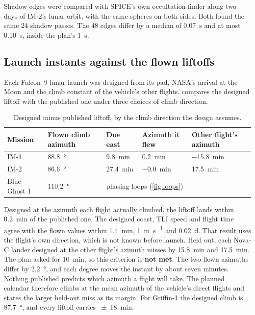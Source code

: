\documentclass[11pt,a4paper]{article}
\begin{document}
Shadow edges were compared with SPICE's own occultation finder along two days of IM-2's
lunar orbit, with the same spheres on both sides. Both found the same 24 shadow passes.
The 48 edges differ by a median of \qty{0.07}{\s} and at most \qty{0.10}{\s}, inside the
plan's \qty{1}{\s}.

\subsection{Launch instants against the flown liftoffs}

Each Falcon~9 lunar launch was designed from its pad, NASA's arrival at the Moon and the
climb constant of the vehicle's other flights.  compares the designed
liftoff with the published one under three choices of climb direction.

\begin{table}[htbp]
\centering\small
\caption{Designed minus published liftoff, by the climb direction the design assumes.}
\label{tab:launch}
\begin{tabular}{@{}lllll@{}}
\toprule
Mission & Flown climb azimuth & Due east & Azimuth it flew & Other flight's azimuth \\
\midrule
IM-1 & \qty{88.8}{\degree} & \qty{+9.8}{\minute} & \qty{+0.2}{\minute} & \qty{-15.8}{\minute} \\
IM-2 & \qty{86.6}{\degree} & \qty{+27.4}{\minute} & \qty{-0.0}{\minute} & \qty{+17.5}{\minute} \\
Blue Ghost 1 & \qty{110.2}{\degree} & \multicolumn{3}{l}{phasing loops (\cref{fig:loops})} \\
\bottomrule
\end{tabular}
\end{table}

Designed at the azimuth each flight actually climbed, the liftoff lands within
\qty{0.2}{\minute} of the published one. The designed coast, TLI speed and flight time
agree with the flown values within \qty{1.4}{\minute}, \qty{1}{\m\per\s} and
\qty{0.02}{\day}. That result uses the flight's own direction, which is not known before
launch. Held out, each Nova-C lander designed at the other flight's azimuth misses by
\qty{15.8}{\minute} and \qty{17.5}{\minute}. The plan asked for \qty{10}{\minute}, so this
criterion is \textbf{not met}. The two flown azimuths differ by \qty{2.2}{\degree}, and
each degree moves the instant by about seven minutes. Nothing published predicts which
azimuth a flight will take. The planned calendar therefore climbs at the mean azimuth of the vehicle's direct flights and states the larger held-out miss as its margin. For Griffin-1 the designed climb is \qty{87.7}{\degree}, and every liftoff carries \qty{\pm 18}{\minute}.
\end{document}
